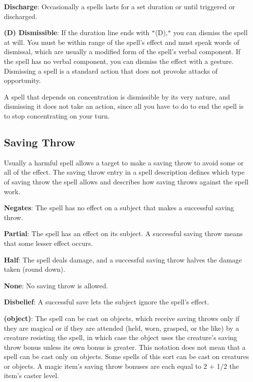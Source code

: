 \textbf{Discharge}: Occasionally a spells lasts for a set duration or until triggered or discharged.
				
\textbf{(D) Dismissible}: If the duration line ends with \texttt{{}"{}}(D),\texttt{{}"{}} you can dismiss the spell at will. You must be within range of the spell's effect and must speak words of dismissal, which are usually a modified form of the spell's verbal component. If the spell has no verbal component, you can dismiss the effect with a gesture. Dismissing a spell is a standard action that does not provoke attacks of opportunity.
				
A spell that depends on concentration is dismissible by its very nature, and dismissing it does not take an action, since all you have to do to end the spell is to stop concentrating on your turn.
				
\subsection{Saving Throw}

				
Usually a harmful spell allows a target to make a saving throw to avoid some or all of the effect. The saving throw entry in a spell description defines which type of saving throw the spell allows and describes how saving throws against the spell work.
				
\textbf{Negates}: The spell has no effect on a subject that makes a successful saving throw.
				
\textbf{Partial}: The spell has an effect on its subject. A successful saving throw means that some lesser effect occurs.
				
\textbf{Half}: The spell deals damage, and a successful saving throw halves the damage taken (round down).
				
\textbf{None}: No saving throw is allowed.
				
\textbf{Disbelief}: A successful save lets the subject ignore the spell's effect. 
				
\textbf{(object)}: The spell can be cast on objects, which receive saving throws only if they are magical or if they are attended (held, worn, grasped, or the like) by a creature resisting the spell, in which case the object uses the creature's saving throw bonus unless its own bonus is greater. This notation does not mean that a spell can be cast only on objects. Some spells of this sort can be cast on creatures or objects. A magic item's saving throw bonuses are each equal to 2 + 1/2 the item's caster level. 
				
